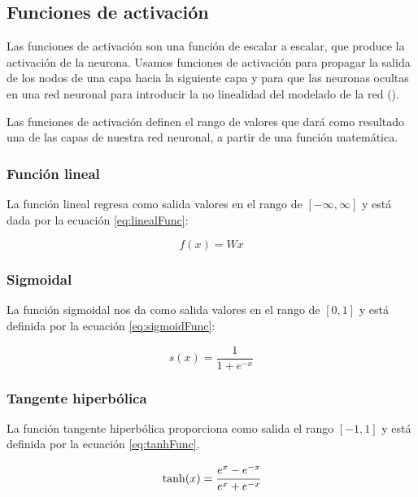 \subsection{Funciones de activación}

Las funciones de activación son una función de escalar a escalar, que produce la activación de la neurona. Usamos funciones de activación para propagar la salida de los nodos de una capa hacia la siguiente capa y para que las neuronas ocultas en una red neuronal para introducir la no linealidad del modelado de la red (\cite{patterson2017deep}).


Las funciones de activación definen el rango de valores que dará como resultado una de las capas de nuestra red neuronal, a partir de una función matemática.

\subsubsection{Función lineal}

La función lineal regresa como salida valores en el rango de $[-\infty,\infty]$ y está dada por la ecuación \ref{eq:linealFunc}:

\begin{equation}
\label{eq:linealFunc}
    f(x) = Wx
\end{equation}

\subsubsection{Sigmoidal}

La función sigmoidal nos da como salida valores en el rango de $[0,1]$ y está definida por la ecuación \ref{eq:sigmoidFunc}:

\begin{equation}
\label{eq:sigmoidFunc}
    s(x)={\frac {1}{1+e^{-x}}}
\end{equation}

\subsubsection{Tangente hiperbólica}

La función tangente hiperbólica proporciona como salida el rango $[-1,1]$ y está definida por la ecuación \ref{eq:tanhFunc}.

\begin{equation}
\label{eq:tanhFunc}
    \tanh (x)={\cfrac {e^{x}-e^{-x}}{e^{x}+e^{-x}}}
\end{equation}

